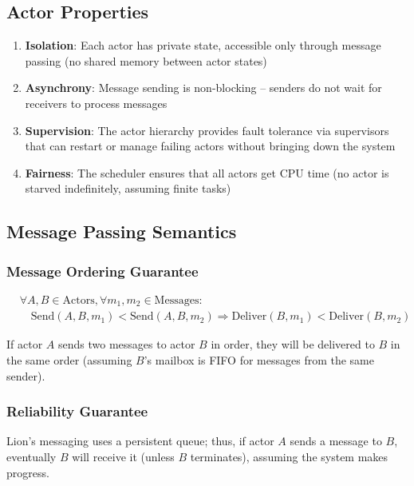 \subsection{Actor Properties}

\begin{enumerate}
\item \textbf{Isolation}: Each actor has private state, accessible only through message passing (no shared memory between actor states)
\item \textbf{Asynchrony}: Message sending is non-blocking – senders do not wait for receivers to process messages
\item \textbf{Supervision}: The actor hierarchy provides fault tolerance via supervisors that can restart or manage failing actors without bringing down the system
\item \textbf{Fairness}: The scheduler ensures that all actors get CPU time (no actor is starved indefinitely, assuming finite tasks)
\end{enumerate}

\subsection{Message Passing Semantics}

\subsubsection{Message Ordering Guarantee}

\begin{align}
&\forall A, B \in \text{Actors}, \forall m_1, m_2 \in \text{Messages}: \nonumber \\
&\quad \text{Send}(A, B, m_1) < \text{Send}(A, B, m_2) \Rightarrow \text{Deliver}(B, m_1) < \text{Deliver}(B, m_2)
\end{align}

If actor $A$ sends two messages to actor $B$ in order, they will be delivered to $B$ in the same order (assuming $B$'s mailbox is FIFO for messages from the same sender).

\subsubsection{Reliability Guarantee}

Lion's messaging uses a persistent queue; thus, if actor $A$ sends a message to $B$, eventually $B$ will receive it (unless $B$ terminates), assuming the system makes progress.

